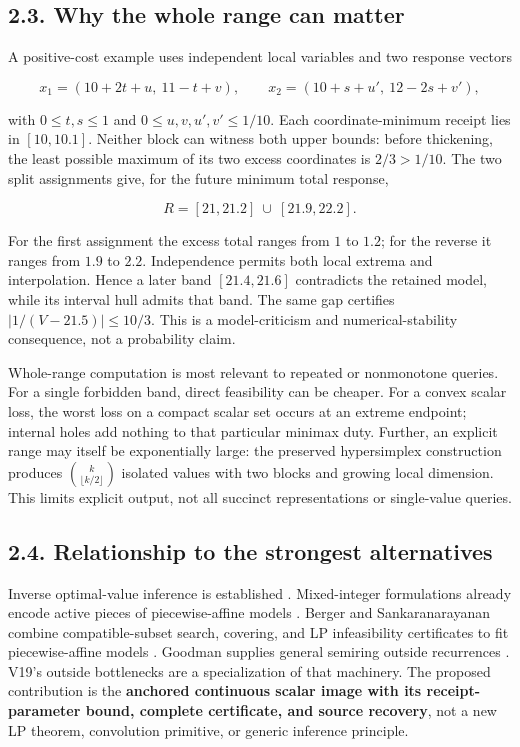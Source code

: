 \documentclass{article}
\theoremstyle{definition}
\begin{document}
\subsection{2.3. Why the whole range can matter}\label{sec-gap}

A positive-cost example uses independent local variables and two
response vectors

\begin{equation}
x_1=(10+2t+u,\ 11-t+v),\qquad
 x_2=(10+s+u',\ 12-2s+v'),
 \label{eq-positive-example}
\end{equation}

with \(0\leq t,s\leq1\) and \(0\leq u,v,u',v'\leq1/10\). Each
coordinate-minimum receipt lies in \([10,10.1]\). Neither block can
witness both upper bounds: before thickening, the least possible maximum
of its two excess coordinates is \(2/3>1/10\). The two split assignments
give, for the future minimum total response,

\begin{equation}
R=[21,21.2]\ \cup\ [21.9,22.2].
 \label{eq-positive-range}
\end{equation}

For the first assignment the excess total ranges from \(1\) to \(1.2\);
for the reverse it ranges from \(1.9\) to \(2.2\). Independence permits
both local extrema and interpolation. Hence a later band \([21.4,21.6]\)
contradicts the retained model, while its interval hull admits that
band. The same gap certifies \(|1/(V-21.5)|\leq10/3\). This is a
model-criticism and numerical-stability consequence, not a probability
claim.

Whole-range computation is most relevant to repeated or nonmonotone
queries. For a single forbidden band, direct feasibility can be cheaper.
For a convex scalar loss, the worst loss on a compact scalar set occurs
at an extreme endpoint; internal holes add nothing to that particular
minimax duty. Further, an explicit range may itself be exponentially
large: the preserved hypersimplex construction produces
\(\binom{k}{\lfloor k/2\rfloor}\) isolated values with two blocks and
growing local dimension. This limits explicit output, not all succinct
representations or single-value queries.

\subsection{2.4. Relationship to the strongest
alternatives}\label{sec-range-prior}

Inverse optimal-value inference is established \citep{inverse}.
Mixed-integer formulations already encode active pieces of
piecewise-affine models \citep{mip}. Berger and Sankaranarayanan combine
compatible-subset search, covering, and LP infeasibility certificates to
fit piecewise-affine models \citep{berger}. Goodman supplies general
semiring outside recurrences \citep{goodman}. V19's outside bottlenecks
are a specialization of that machinery. The proposed contribution is the
\textbf{anchored continuous scalar image with its receipt-parameter
bound, complete certificate, and source recovery}, not a new LP theorem,
convolution primitive, or generic inference principle.
\end{document}
